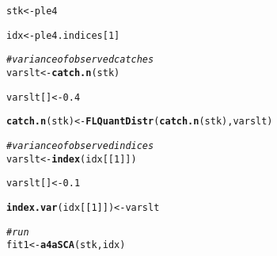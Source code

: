 \documentclass[a4paper,english,10pt]{article}\usepackage[]{graphicx}\usepackage[]{color}
\makeatletter
\newcommand{\hlnum}[1]{\textcolor[rgb]{0.686,0.059,0.569}{#1}}%
\newcommand{\hlcom}[1]{\textcolor[rgb]{0.678,0.584,0.686}{\textit{#1}}}%
\newcommand{\hlstd}[1]{\textcolor[rgb]{0.345,0.345,0.345}{#1}}%
\newcommand{\hlkwb}[1]{\textcolor[rgb]{0.69,0.353,0.396}{#1}}%
\newcommand{\hlkwd}[1]{\textcolor[rgb]{0.737,0.353,0.396}{\textbf{#1}}}%
\newenvironment{kframe}{%
 \def\at@end@of@kframe{}%
 \ifinner\ifhmode%
  \def\at@end@of@kframe{\end{minipage}}%
  \begin{minipage}{\columnwidth}%
 \fi\fi%
 \def\FrameCommand##1{\hskip\@totalleftmargin \hskip-\fboxsep
 \colorbox{shadecolor}{##1}\hskip-\fboxsep
     \hskip-\linewidth \hskip-\@totalleftmargin \hskip\columnwidth}%
 \MakeFramed {\advance\hsize-\width
   \@totalleftmargin\z@ \linewidth\hsize
   \@setminipage}}%
 {\par\unskip\endMakeFramed%
 \at@end@of@kframe}
\newenvironment{knitrout}{}{} %
\makeatother
\begin{document}
\begin{knitrout}
\color{fgcolor}\begin{kframe}
\begin{alltt}
\hlstd{stk} \hlkwb{<-} \hlstd{ple4}
\end{alltt}


{\ttfamily\noindent\bfseries\color{errorcolor}{\#\# Error: object 'ple4' not found}}\begin{alltt}
\hlstd{idx} \hlkwb{<-} \hlstd{ple4.indices[}\hlnum{1}\hlstd{]}
\end{alltt}


{\ttfamily\noindent\bfseries\color{errorcolor}{\#\# Error: object 'ple4.indices' not found}}\begin{alltt}
\hlcom{# variance of observed catches}
\hlstd{varslt} \hlkwb{<-} \hlkwd{catch.n}\hlstd{(stk)}
\end{alltt}


{\ttfamily\noindent\bfseries{}}\begin{alltt}
\hlstd{varslt[]} \hlkwb{<-} \hlnum{0.4}
\end{alltt}


{\ttfamily\noindent\bfseries\color{errorcolor}{\#\# Error: object 'varslt' not found}}\begin{alltt}
\hlkwd{catch.n}\hlstd{(stk)} \hlkwb{<-} \hlkwd{FLQuantDistr}\hlstd{(}\hlkwd{catch.n}\hlstd{(stk), varslt)}
\end{alltt}


{\ttfamily\noindent\bfseries{}}\begin{alltt}
\hlcom{# variance of observed indices}
\hlstd{varslt} \hlkwb{<-} \hlkwd{index}\hlstd{(idx[[}\hlnum{1}\hlstd{]])}
\end{alltt}


{\ttfamily\noindent\bfseries{}}\begin{alltt}
\hlstd{varslt[]} \hlkwb{<-} \hlnum{0.1}
\end{alltt}


{\ttfamily\noindent\bfseries\color{errorcolor}{\#\# Error: object 'varslt' not found}}\begin{alltt}
\hlkwd{index.var}\hlstd{(idx[[}\hlnum{1}\hlstd{]])} \hlkwb{<-} \hlstd{varslt}
\end{alltt}


{\ttfamily\noindent\bfseries\color{errorcolor}{\#\# Error: object 'varslt' not found}}\begin{alltt}
\hlcom{# run}
\hlstd{fit1} \hlkwb{<-} \hlkwd{a4aSCA}\hlstd{(stk, idx)}
\end{alltt}



\end{kframe}
\end{knitrout}
\end{document}
